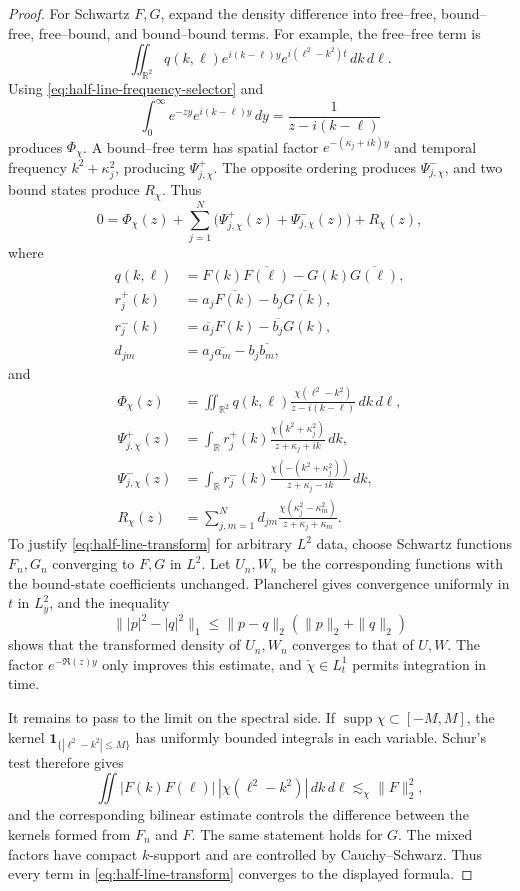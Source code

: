 \documentclass[11pt]{amsart}
\numberwithin{equation}{section}
\theoremstyle{remark}
\newcommand{\R}{\mathbb R}
\newcommand{\supp}{\operatorname{supp}}
\begin{document}
\begin{proof}
For Schwartz $F,G$, expand the density difference into free--free,
bound--free, free--bound, and bound--bound terms.  For example, the
free--free term is
\[
 \iint_{\R^2}q(k,\ell)
 e^{i(k-\ell)y}e^{i(\ell^2-k^2)t}\,dk\,d\ell.
\]
Using \eqref{eq:half-line-frequency-selector} and
\[
 \int_0^\infty e^{-zy}e^{i(k-\ell)y}\,dy
 =\frac1{z-i(k-\ell)}
\]
produces $\Phi_\chi$.  A bound--free term has spatial factor
$e^{-(\kappa_j+ik)y}$ and temporal frequency $k^2+\kappa_j^2$, producing
$\Psi^+_{j,\chi}$.  The opposite ordering produces
$\Psi^-_{j,\chi}$, and two bound states produce $R_\chi$.  Thus
\begin{equation}
 0=\Phi_\chi(z)+\sum_{j=1}^N\bigl(\Psi^+_{j,\chi}(z)
       +\Psi^-_{j,\chi}(z)\bigr)+R_\chi(z),
 \label{eq:half-line-transform}
\end{equation}
where
\begin{align*}
 q(k,\ell)&=F(k)\overline{F(\ell)}-G(k)\overline{G(\ell)},\\
 r_j^+(k)&=a_j\overline{F(k)}-b_j\overline{G(k)},\\
 r_j^-(k)&=\overline{a_j}F(k)-\overline{b_j}G(k),\\
 d_{jm}&=a_j\overline{a_m}-b_j\overline{b_m},
\end{align*}
and
\begin{align*}
 \Phi_\chi(z)
 &=\iint_{\R^2}q(k,\ell)
   \frac{\chi(\ell^2-k^2)}{z-i(k-\ell)}\,dk\,d\ell,\\
 \Psi^+_{j,\chi}(z)
 &=\int_\R r_j^+(k)
   \frac{\chi(k^2+\kappa_j^2)}{z+\kappa_j+ik}\,dk,\\
 \Psi^-_{j,\chi}(z)
 &=\int_\R r_j^-(k)
   \frac{\chi(-(k^2+\kappa_j^2))}{z+\kappa_j-ik}\,dk,\\
 R_\chi(z)
 &=\sum_{j,m=1}^Nd_{jm}
   \frac{\chi(\kappa_j^2-\kappa_m^2)}{z+\kappa_j+\kappa_m}.
\end{align*}
To justify \eqref{eq:half-line-transform} for arbitrary $L^2$ data, choose
Schwartz functions $F_n,G_n$ converging to $F,G$ in $L^2$.  Let $U_n,W_n$ be
the corresponding functions with the bound-state coefficients unchanged.
Plancherel gives convergence uniformly in $t$ in $L^2_y$, and the inequality
\[
 \||p|^2-|q|^2\|_1\le\|p-q\|_2(\|p\|_2+\|q\|_2)
\]
shows that the transformed density of $U_n,W_n$ converges to that of $U,W$.
The factor $e^{-\Re(z)y}$ only improves this estimate, and
$\check\chi\in L^1_t$ permits integration in time.

It remains to pass to the limit on the spectral side.  If
$\supp\chi\subset[-M,M]$, the kernel
$\mathbf 1_{\{|\ell^2-k^2|\le M\}}$ has uniformly bounded integrals in each
variable.  Schur's test therefore gives
\[
 \iint |F(k)F(\ell)|\,|\chi(\ell^2-k^2)|\,dk\,d\ell
 \lesssim_{\chi}\|F\|_2^2,
\]
and the corresponding bilinear estimate controls the difference between the
kernels formed from $F_n$ and $F$.  The same statement holds for $G$.
The mixed factors have compact $k$-support and are controlled by
Cauchy--Schwarz.  Thus every term in \eqref{eq:half-line-transform} converges
to the displayed formula.


\end{proof}
\end{document}
